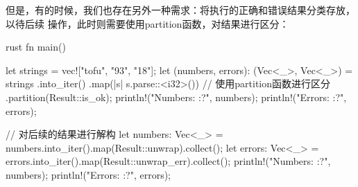但是，有的时候，我们也存在另外一种需求：将执行的正确和错误结果分类存放，以待后续
操作，此时则需要使用partition函数，对结果进行区分：
\begin{code-block}{rust}
fn main() {
    let strings = vec!["tofu", "93", "18"];
    let (numbers, errors): (Vec<_>, Vec<_>) = strings
        .into_iter()
        .map(|s| s.parse::<i32>())
        // 使用partition函数进行区分
        .partition(Result::is_ok);
    println!("Numbers: {:?}", numbers);
    println!("Errors: {:?}", errors);

    // 对后续的结果进行解构
    let numbers: Vec<_> = numbers.into_iter().map(Result::unwrap).collect();
    let errors: Vec<_> = errors.into_iter().map(Result::unwrap_err).collect();
    println!("Numbers: {:?}", numbers);
    println!("Errors: {:?}", errors);
}
\end{code-block}
